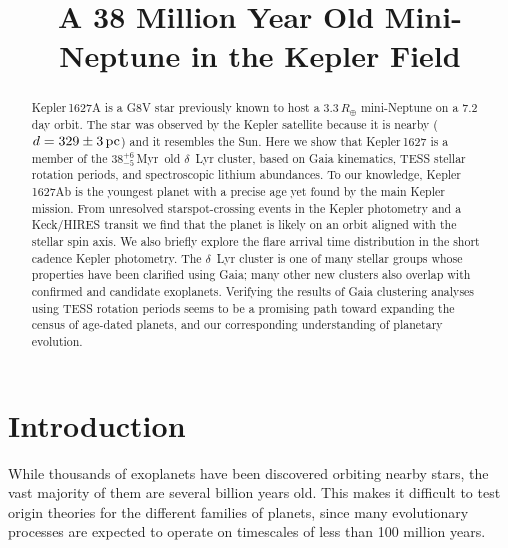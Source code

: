 \documentclass[12pt,modern,twocolumn,tighten]{aastex63}
\newcommand{\clusterage}{$38^{+6}_{-5}$\,Myr} %
\begin{document}
\title{
  A 38 Million Year Old Mini-Neptune in the Kepler Field
}



\begin{abstract}
  Kepler\,1627A is a G8V star previously known to host a
  $3.3\,R_\oplus$ mini-Neptune on a 7.2\,day orbit.  The star was
  observed by the Kepler satellite because it is nearby
  ($d=329\pm3\,{\rm pc}$) and it resembles the Sun.  Here we show that
  Kepler\,1627 is a member of the \clusterage\ old $\delta$~Lyr
  cluster, based on Gaia kinematics, TESS stellar rotation
  periods, and spectroscopic lithium abundances.  To
  our knowledge, Kepler\,1627Ab is the youngest planet with a precise
  age yet found by the main Kepler mission.  From unresolved
  starspot-crossing events in the Kepler photometry and
  a Keck/HIRES transit we find that the planet is likely on an
  orbit aligned with the stellar spin axis.  We also briefly explore the flare
  arrival time distribution in the short cadence Kepler
  photometry.
  The $\delta$~Lyr cluster is one of many stellar groups whose
  properties have been clarified using Gaia; many other new
  clusters also overlap with confirmed and candidate exoplanets.
  Verifying the results of Gaia clustering analyses using TESS rotation
  periods seems to be a promising path toward expanding the census of
  age-dated planets, and our corresponding understanding of planetary evolution.
\end{abstract}




\section{Introduction}

While thousands of exoplanets have been discovered orbiting nearby
stars, the vast majority of them are several billion years old.  This
makes it difficult to test origin theories for the different families
of planets, since many evolutionary processes are expected to operate
on timescales of less than 100 million years.
\end{document}
